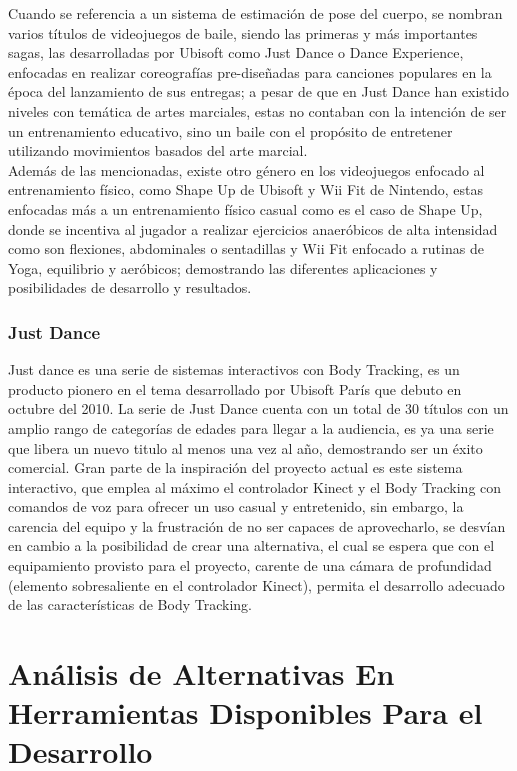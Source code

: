 Cuando se referencia a un sistema de estimación de pose del cuerpo, se nombran varios títulos de videojuegos de baile, siendo las primeras y más importantes sagas, las desarrolladas por Ubisoft como Just Dance o Dance Experience, enfocadas en realizar coreografías pre-diseñadas para canciones populares en la época del lanzamiento de sus entregas; a pesar de que en Just Dance han existido niveles con temática de artes marciales, estas no contaban con la intención de ser un entrenamiento educativo, sino un baile con el propósito de entretener utilizando movimientos basados del arte marcial.  
\\
Además de las mencionadas, existe otro género en los videojuegos enfocado al entrenamiento físico, como Shape Up de Ubisoft y Wii Fit de Nintendo, estas enfocadas más a un entrenamiento físico casual como es el caso de Shape Up, donde se incentiva al jugador a realizar ejercicios anaeróbicos de alta intensidad como son flexiones, abdominales o sentadillas y Wii Fit enfocado a rutinas de Yoga, equilibrio y aeróbicos; demostrando las diferentes aplicaciones y posibilidades de desarrollo y resultados. \\

\subsubsection{Just Dance}

Just dance es una serie de sistemas interactivos con Body Tracking, es un producto pionero en el tema desarrollado por Ubisoft París que debuto en octubre del 2010. La serie de Just Dance cuenta con un total de 30 títulos con un amplio rango de categorías de edades para llegar a la audiencia, es ya una serie que libera un nuevo titulo al menos una vez al año, demostrando ser un éxito comercial. Gran parte de la inspiración del proyecto actual es este sistema interactivo, que emplea al máximo el controlador Kinect y el Body Tracking con comandos de voz para ofrecer un uso casual y entretenido, sin embargo, la carencia del equipo y la frustración de no ser capaces de aprovecharlo, se desvían en cambio a la posibilidad de crear una alternativa, el cual se espera que con el equipamiento provisto para el proyecto, carente de una cámara de profundidad (elemento sobresaliente en el controlador Kinect), permita el desarrollo adecuado de las características de Body Tracking.


\section{Análisis de Alternativas En Herramientas Disponibles Para el Desarrollo}

